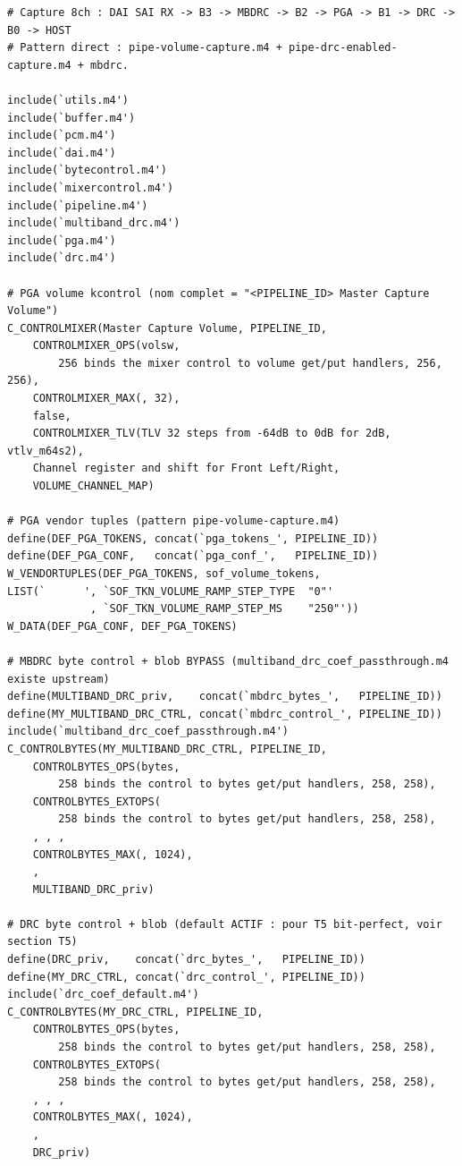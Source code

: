 \documentclass[11pt,a4paper]{article}
\begin{document}
\begin{lstlisting}[language={}, basicstyle=\ttfamily\scriptsize]
# Capture 8ch : DAI SAI RX -> B3 -> MBDRC -> B2 -> PGA -> B1 -> DRC -> B0 -> HOST
# Pattern direct : pipe-volume-capture.m4 + pipe-drc-enabled-capture.m4 + mbdrc.

include(`utils.m4')
include(`buffer.m4')
include(`pcm.m4')
include(`dai.m4')
include(`bytecontrol.m4')
include(`mixercontrol.m4')
include(`pipeline.m4')
include(`multiband_drc.m4')
include(`pga.m4')
include(`drc.m4')

# PGA volume kcontrol (nom complet = "<PIPELINE_ID> Master Capture Volume")
C_CONTROLMIXER(Master Capture Volume, PIPELINE_ID,
    CONTROLMIXER_OPS(volsw,
        256 binds the mixer control to volume get/put handlers, 256, 256),
    CONTROLMIXER_MAX(, 32),
    false,
    CONTROLMIXER_TLV(TLV 32 steps from -64dB to 0dB for 2dB, vtlv_m64s2),
    Channel register and shift for Front Left/Right,
    VOLUME_CHANNEL_MAP)

# PGA vendor tuples (pattern pipe-volume-capture.m4)
define(DEF_PGA_TOKENS, concat(`pga_tokens_', PIPELINE_ID))
define(DEF_PGA_CONF,   concat(`pga_conf_',   PIPELINE_ID))
W_VENDORTUPLES(DEF_PGA_TOKENS, sof_volume_tokens,
LIST(`      ', `SOF_TKN_VOLUME_RAMP_STEP_TYPE  "0"'
             , `SOF_TKN_VOLUME_RAMP_STEP_MS    "250"'))
W_DATA(DEF_PGA_CONF, DEF_PGA_TOKENS)

# MBDRC byte control + blob BYPASS (multiband_drc_coef_passthrough.m4 existe upstream)
define(MULTIBAND_DRC_priv,    concat(`mbdrc_bytes_',   PIPELINE_ID))
define(MY_MULTIBAND_DRC_CTRL, concat(`mbdrc_control_', PIPELINE_ID))
include(`multiband_drc_coef_passthrough.m4')
C_CONTROLBYTES(MY_MULTIBAND_DRC_CTRL, PIPELINE_ID,
    CONTROLBYTES_OPS(bytes,
        258 binds the control to bytes get/put handlers, 258, 258),
    CONTROLBYTES_EXTOPS(
        258 binds the control to bytes get/put handlers, 258, 258),
    , , ,
    CONTROLBYTES_MAX(, 1024),
    ,
    MULTIBAND_DRC_priv)

# DRC byte control + blob (default ACTIF : pour T5 bit-perfect, voir section T5)
define(DRC_priv,    concat(`drc_bytes_',   PIPELINE_ID))
define(MY_DRC_CTRL, concat(`drc_control_', PIPELINE_ID))
include(`drc_coef_default.m4')
C_CONTROLBYTES(MY_DRC_CTRL, PIPELINE_ID,
    CONTROLBYTES_OPS(bytes,
        258 binds the control to bytes get/put handlers, 258, 258),
    CONTROLBYTES_EXTOPS(
        258 binds the control to bytes get/put handlers, 258, 258),
    , , ,
    CONTROLBYTES_MAX(, 1024),
    ,
    DRC_priv)


\end{lstlisting}
\end{document}
